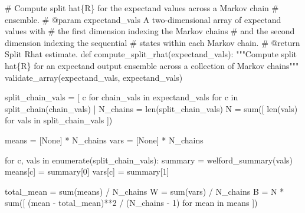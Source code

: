\documentclass[
  letterpaper,
  DIV=11,
  numbers=noendperiod]{scrartcl}
\newenvironment{Shaded}{\begin{snugshade}}{\end{snugshade}}
\newcommand{\BuiltInTok}[1]{\textcolor[rgb]{0.00,0.23,0.31}{#1}}
\newcommand{\CommentTok}[1]{\textcolor[rgb]{0.37,0.37,0.37}{#1}}
\newcommand{\ControlFlowTok}[1]{\textcolor[rgb]{0.00,0.23,0.31}{#1}}
\newcommand{\DecValTok}[1]{\textcolor[rgb]{0.68,0.00,0.00}{#1}}
\newcommand{\KeywordTok}[1]{\textcolor[rgb]{0.00,0.23,0.31}{#1}}
\newcommand{\NormalTok}[1]{\textcolor[rgb]{0.00,0.23,0.31}{#1}}
\newcommand{\OperatorTok}[1]{\textcolor[rgb]{0.37,0.37,0.37}{#1}}
\newcommand{\StringTok}[1]{\textcolor[rgb]{0.13,0.47,0.30}{#1}}
\newcommand{\VariableTok}[1]{\textcolor[rgb]{0.07,0.07,0.07}{#1}}
\begin{document}
\begin{Shaded}
\begin{Highlighting}[]
\CommentTok{\# Compute split hat\{R\} for the expectand values across a Markov chain}
\CommentTok{\# ensemble.}
\CommentTok{\# @param expectand\_vals A two{-}dimensional array of expectand values with}
\CommentTok{\#                       the first dimension indexing the Markov chains}
\CommentTok{\#                       and the second dimension indexing the sequential}
\CommentTok{\#                       states within each Markov chain.}
\CommentTok{\# @return Split Rhat estimate.}
\KeywordTok{def}\NormalTok{ compute\_split\_rhat(expectand\_vals):}
  \CommentTok{"""Compute split hat\{R\} for an expectand output ensemble across}
\CommentTok{     a collection of Markov chains"""}
\NormalTok{  validate\_array(expectand\_vals, }\StringTok{\textquotesingle{}expectand\_vals\textquotesingle{}}\NormalTok{)}
  
\NormalTok{  split\_chain\_vals }\OperatorTok{=}\NormalTok{ [ c }\ControlFlowTok{for}\NormalTok{ chain\_vals }\KeywordTok{in}\NormalTok{ expectand\_vals}
                       \ControlFlowTok{for}\NormalTok{ c }\KeywordTok{in}\NormalTok{ split\_chain(chain\_vals) ]}
\NormalTok{  N\_chains }\OperatorTok{=} \BuiltInTok{len}\NormalTok{(split\_chain\_vals)}
\NormalTok{  N }\OperatorTok{=} \BuiltInTok{sum}\NormalTok{([ }\BuiltInTok{len}\NormalTok{(vals) }\ControlFlowTok{for}\NormalTok{ vals }\KeywordTok{in}\NormalTok{ split\_chain\_vals ])}
  
\NormalTok{  means }\OperatorTok{=}\NormalTok{ [}\VariableTok{None}\NormalTok{] }\OperatorTok{*}\NormalTok{ N\_chains}
  \BuiltInTok{vars} \OperatorTok{=}\NormalTok{ [}\VariableTok{None}\NormalTok{] }\OperatorTok{*}\NormalTok{ N\_chains}
  
  \ControlFlowTok{for}\NormalTok{ c, vals }\KeywordTok{in} \BuiltInTok{enumerate}\NormalTok{(split\_chain\_vals):}
\NormalTok{    summary }\OperatorTok{=}\NormalTok{ welford\_summary(vals)}
\NormalTok{    means[c] }\OperatorTok{=}\NormalTok{ summary[}\DecValTok{0}\NormalTok{]}
    \BuiltInTok{vars}\NormalTok{[c] }\OperatorTok{=}\NormalTok{ summary[}\DecValTok{1}\NormalTok{]}
  
\NormalTok{  total\_mean }\OperatorTok{=} \BuiltInTok{sum}\NormalTok{(means) }\OperatorTok{/}\NormalTok{ N\_chains}
\NormalTok{  W }\OperatorTok{=} \BuiltInTok{sum}\NormalTok{(}\BuiltInTok{vars}\NormalTok{) }\OperatorTok{/}\NormalTok{ N\_chains}
\NormalTok{  B }\OperatorTok{=}\NormalTok{ N }\OperatorTok{*} \BuiltInTok{sum}\NormalTok{([ (mean }\OperatorTok{{-}}\NormalTok{ total\_mean)}\OperatorTok{**}\DecValTok{2} \OperatorTok{/}\NormalTok{ (N\_chains }\OperatorTok{{-}} \DecValTok{1}\NormalTok{) }
                \ControlFlowTok{for}\NormalTok{ mean }\KeywordTok{in}\NormalTok{ means ])}
  

\end{Highlighting}
\end{Shaded}
\end{document}
